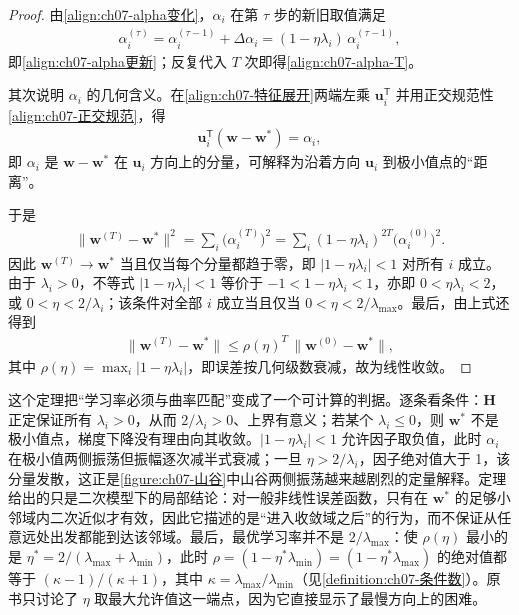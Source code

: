\documentclass[../../main.tex]{subfiles}
\begin{document}
\begin{proof}
由\eqref{align:ch07-alpha变化}，$\alpha_i$ 在第 $\tau$ 步的新旧取值满足
\begin{align*}
\alpha_i^{(\tau)} = \alpha_i^{(\tau-1)}+\Delta\alpha_i = (1-\eta\lambda_i)\,\alpha_i^{(\tau-1)},
\end{align*}
即\eqref{align:ch07-alpha更新}；反复代入 $T$ 次即得\eqref{align:ch07-alpha-T}。

其次说明 $\alpha_i$ 的几何含义。在\eqref{align:ch07-特征展开}两端左乘 $\mathbf{u}_i^{\mathsf T}$ 并用正交规范性\eqref{align:ch07-正交规范}，得
\begin{align*}
\mathbf{u}_i^{\mathsf T}(\mathbf{w}-\mathbf{w}^{\ast}) = \alpha_i,
\end{align*}
即 $\alpha_i$ 是 $\mathbf{w}-\mathbf{w}^{\ast}$ 在 $\mathbf{u}_i$ 方向上的分量，可解释为沿着方向 $\mathbf{u}_i$ 到极小值点的“距离”。

于是
\begin{align*}
\|\mathbf{w}^{(T)}-\mathbf{w}^{\ast}\|^{2} = \sum_i\bigl(\alpha_i^{(T)}\bigr)^{2} = \sum_i(1-\eta\lambda_i)^{2T}\bigl(\alpha_i^{(0)}\bigr)^{2}.
\end{align*}
因此 $\mathbf{w}^{(T)}\to\mathbf{w}^{\ast}$ 当且仅当每个分量都趋于零，即 $|1-\eta\lambda_i|<1$ 对所有 $i$ 成立。由于 $\lambda_i>0$，不等式 $|1-\eta\lambda_i|<1$ 等价于 $-1<1-\eta\lambda_i<1$，亦即 $0<\eta\lambda_i<2$，或 $0<\eta<2/\lambda_i$；该条件对全部 $i$ 成立当且仅当 $0<\eta<2/\lambda_{\max}$。最后，由上式还得到
\begin{align*}
\|\mathbf{w}^{(T)}-\mathbf{w}^{\ast}\| \leqslant \rho(\eta)^{T}\,\|\mathbf{w}^{(0)}-\mathbf{w}^{\ast}\|,
\end{align*}
其中 $\rho(\eta)=\max_i|1-\eta\lambda_i|$，即误差按几何级数衰减，故为线性收敛。
\end{proof}

\begin{remark}
这个定理把“学习率必须与曲率匹配”变成了一个可计算的判据。逐条看条件：$\mathbf{H}$ 正定保证所有 $\lambda_i>0$，从而 $2/\lambda_i>0$、上界有意义；若某个 $\lambda_i\leqslant0$，则 $\mathbf{w}^{\ast}$ 不是极小值点，梯度下降没有理由向其收敛。$|1-\eta\lambda_i|<1$ 允许因子取负值，此时 $\alpha_i$ 在极小值两侧振荡但振幅逐次减半式衰减；一旦 $\eta>2/\lambda_i$，因子绝对值大于 1，该分量发散，这正是\cref{figure:ch07-山谷}中山谷两侧振荡越来越剧烈的定量解释。定理给出的只是二次模型下的局部结论：对一般非线性误差函数，只有在 $\mathbf{w}^{\ast}$ 的足够小邻域内二次近似才有效，因此它描述的是“进入收敛域之后”的行为，而不保证从任意远处出发都能到达该邻域。最后，最优学习率并不是 $2/\lambda_{\max}$：使 $\rho(\eta)$ 最小的是 $\eta^{\ast}=2/(\lambda_{\max}+\lambda_{\min})$，此时 $\rho=(1-\eta^{\ast}\lambda_{\min})=(1-\eta^{\ast}\lambda_{\max})$ 的绝对值都等于 $(\kappa-1)/(\kappa+1)$，其中 $\kappa=\lambda_{\max}/\lambda_{\min}$（见\cref{definition:ch07-条件数}）。原书只讨论了 $\eta$ 取最大允许值这一端点，因为它直接显示了最慢方向上的困难。
\end{remark}
\end{document}
